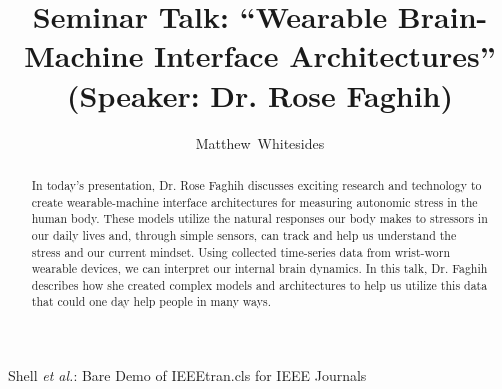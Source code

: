 \documentclass[journal,onecolumn]{IEEEtran}
\begin{document}
%
\title{Seminar Talk: ``Wearable Brain-Machine Interface Architectures'' (Speaker: Dr. Rose Faghih)}

%
%
%
\author{Matthew~Whitesides}%

%
{Shell \MakeLowercase{\textit{et al.}}: Bare Demo of IEEEtran.cls for IEEE Journals}

\maketitle

\begin{abstract}
  In today's presentation, Dr. Rose Faghih discusses exciting research and technology to create wearable-machine interface architectures for measuring autonomic stress in the human body. These models utilize the natural responses our body makes to stressors in our daily lives and, through simple sensors, can track and help us understand the stress and our current mindset. Using collected time-series data from wrist-worn wearable devices, we can interpret our internal brain dynamics. In this talk, Dr. Faghih describes how she created complex models and architectures to help us utilize this data that could one day help people in many ways. 
\end{abstract}

\end{document}
